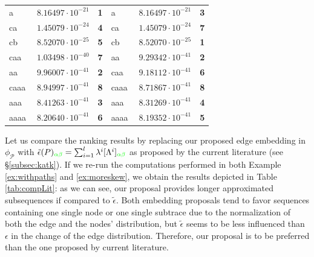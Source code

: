 \begin{table}[!t]
\begin{tabular}{lc|l||lc|l}
		a & $\;8.16497\cdot10^{-21}$ & \textbf{\color{blue}1} & a & $\;8.16497\cdot 10^{-21}$ & \textbf{\color{red}3} \\
		ca & $\;1.45079\cdot10^{-24}$ & \textbf{\color{blue}4} & ca &  $\;1.45079\cdot 10^{-24}$ & \textbf{\color{red}7}\\
		cb & $\;8.52070\cdot10^{-25}$ & \textbf{\color{blue}5} & cb & $\;8.52070\cdot10^{-25}$& \textbf{\color{blue}1}\\
		caa & $\;1.03498\cdot10^{-40}$ & \textbf{\color{blue}7} & aa & $\;9.29342\cdot10^{-41}$ & \textbf{\color{blue}2}\\
		aa & $\;9.96007\cdot10^{-41}$ & \textbf{\color{red}2} & caa & $\;9.18112\cdot10^{-41}$ & \textbf{\color{blue}6}\\
		caaa & $\;8.94997\cdot10^{-41}$ & \textbf{\color{red}8} & caaa & $\;8.71867\cdot10^{-41}$ & \textbf{\color{blue}8}\\
		aaa & $\;8.41263\cdot10^{-41}$ &  \textbf{\color{red}3} & aaa & $\;8.31269\cdot10^{-41}$ & \textbf{\color{red}4}\\
		aaaa & $\;8.20640\cdot10^{-41}$ &  \textbf{\color{red}6} & aaaa & $\;8.19352\cdot10^{-41}$ & \textbf{\color{red}5}\\
		
		\bottomrule
	\end{tabular}
\end{table}

\begin{example}\label{ex:cmpexample}
	Let us compare the ranking results by replacing our proposed edge embedding in $\phi_{\mathcal{P}}$ with $\tilde{\epsilon}(P)_{\color{green}\alpha\beta}=\sum_{i=1}^l\lambda^i[\Lambda^i]_{\color{green}\alpha\beta}$ as proposed by the current literature (see \S\ref{subsec:katk}). If we re-run the computations performed in both Example \ref{ex:withpaths} and \ref{ex:moreskew}, we obtain the results depicted in Table \ref{tab:compLit}: as we can see, our proposal provides longer approximated subsequences if compared to $\tilde{\epsilon}$. Both embedding proposals tend to favor sequences containing one single node or one single subtrace due to the normalization of both  the edge and the nodes' distribution, but $\tilde{\epsilon}$ seems to be less influenced than $\epsilon$ in the change of the edge distribution. Therefore, our proposal is to be preferred than the one proposed by current literature.
\end{example}

